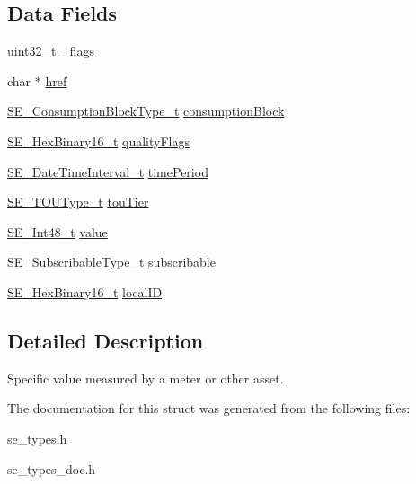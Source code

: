 \subsection*{Data Fields}
\begin{DoxyCompactItemize}
\item 
uint32\+\_\+t \hyperlink{group__Reading_gaa7f6de4bc1e39a68c78b5e16db226694}{\+\_\+flags}
\item 
char $\ast$ \hyperlink{group__Reading_ga95c214b9b296909170e1426a83adcd63}{href}
\item 
\hyperlink{group__ConsumptionBlockType_ga526f797922e4c3009d50c28f457c462e}{S\+E\+\_\+\+Consumption\+Block\+Type\+\_\+t} \hyperlink{group__Reading_ga23b7fc58868416c4249ac364750c8884}{consumption\+Block}
\item 
\hyperlink{group__HexBinary16_gac040be0e918a360be6bcf5e8b8ad2c49}{S\+E\+\_\+\+Hex\+Binary16\+\_\+t} \hyperlink{group__Reading_ga4ba92621db8e5121414fbf926f56c57b}{quality\+Flags}
\item 
\hyperlink{structSE__DateTimeInterval__t}{S\+E\+\_\+\+Date\+Time\+Interval\+\_\+t} \hyperlink{group__Reading_gae2c965e36cb3bfd4d5efe6772099ac2c}{time\+Period}
\item 
\hyperlink{group__TOUType_gadcfd871f87df34ae8228b9484ebedc6a}{S\+E\+\_\+\+T\+O\+U\+Type\+\_\+t} \hyperlink{group__Reading_gaba7139999e2a8cbd77c4caf446c80503}{tou\+Tier}
\item 
\hyperlink{group__Int48_ga87620025dc9f6c732fa48fcab95861ce}{S\+E\+\_\+\+Int48\+\_\+t} \hyperlink{group__Reading_ga298b1b3d2687afb45f8b481db80648de}{value}
\item 
\hyperlink{group__SubscribableType_ga5c41f553d369710ed34619266bf2551e}{S\+E\+\_\+\+Subscribable\+Type\+\_\+t} \hyperlink{group__Reading_ga2b7915c8c3cbef1287a66b4b501dad3c}{subscribable}
\item 
\hyperlink{group__HexBinary16_gac040be0e918a360be6bcf5e8b8ad2c49}{S\+E\+\_\+\+Hex\+Binary16\+\_\+t} \hyperlink{group__Reading_ga5242942e56b0d190231a18aa848f5912}{local\+ID}
\end{DoxyCompactItemize}


\subsection{Detailed Description}
Specific value measured by a meter or other asset. 

The documentation for this struct was generated from the following files\+:\begin{DoxyCompactItemize}
\item 
se\+\_\+types.\+h\item 
se\+\_\+types\+\_\+doc.\+h\end{DoxyCompactItemize}
